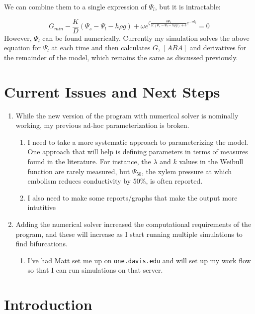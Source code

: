 \documentclass[12pt]{amsart}
\begin{document}
We can combine them to a single expression of $\Psi_l$, but it is intractable:

\begin{equation}\label{pain}
G_{min} - \frac{K}{D}(\Psi_s - \Psi_l - h \rho g) + \omega e^{\zeta \frac{a \Psi_s}{K(\Psi_s - \Psi_l - h \rho g) + b} e^{- \tau \Psi_l}} = 0
\end{equation}
However, $\Psi_l$ can be found numerically.   Currently my simulation solves the above equation for $\Psi_l$ at each time and then calculates $G$, $[ABA]$ and derivatives for the remainder of the model, which remains the same as discussed previously.

\section{Current Issues and Next Steps}
 
\begin{enumerate}
  \item While the new  version of the program with numerical solver is nominally working, my previous ad-hoc parameterization is broken. 
  \begin{enumerate}
  	\item I need to take a more systematic approach to parameterizing the model.  One approach that will help is defining parameters in terms of measures found in the literature.  For instance, the $\lambda$ and $k$ values in the Weibull function are rarely measured, but $\Psi_{50}$, the xylem pressure at which embolism reduces conductivity by 50\%, is often reported.
	\item I also need to make some reports/graphs that make the output more intutitive
  \end{enumerate}
  \item Adding the numerical solver increased the computational requirements of the program, and these will increase as I start running multiple simulations to find bifurcations.
  \begin{enumerate}
  	\item I've had Matt set me up on \texttt{one.davis.edu} and will set up my work flow so that I can run simulations on that server.
  \end{enumerate}
\end{enumerate}

\pagebreak


\section{Introduction}
\end{document}
